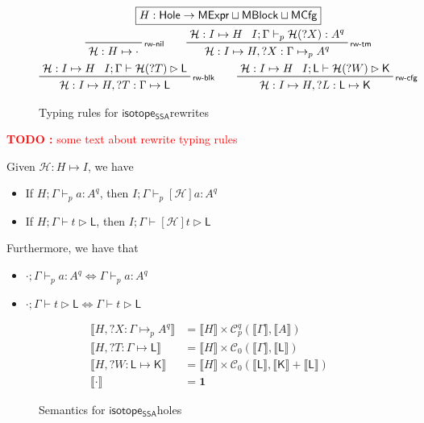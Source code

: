\documentclass[acmsmall,screen,review]{acmart}
\newcounter{todos}
\newcommand{\TODO}[1]{{
  \stepcounter{todos}
  \begin{center}\large{\textcolor{red}{\textbf{TODO \arabic{todos}:} #1}}\end{center}
}}
\newcommand{\mc}[1]{\ensuremath{\mathcal{#1}}}
\newcommand{\mb}[1]{\ensuremath{\mathbf{#1}}}
\newcommand{\ms}[1]{\ensuremath{\mathsf{#1}}}
\newcommand{\rle}[1]{{\scriptsize\textsf{#1}}}
\newcommand{\hasty}[5]{#1 \vdash_{#2} #3: {#4}^{#5}}
\newcommand{\haslb}[3]{#1 \vdash #2 \rhd #3}
\newcommand{\lhole}[1]{?#1}
\newcommand{\mhasty}[6]{#1;#2 \vdash_{#3} #4: {#5}^{#6}}
\newcommand{\mhaslb}[4]{#1;#2 \vdash #3 \rhd #4}
\newcommand{\mlhaslb}[4]{#1;#2 \vdash #3 \rhd #4}
\newcommand{\tyhole}[5]{#1: #2 \mapsto_{#3} {#4}^{#5}}
\newcommand{\blkhole}[3]{#1: #2 \mapsto #3}
\newcommand{\cfghole}[3]{#1: #2 \mapsto #3}
\newcommand{\isrw}[3]{#1: #2 \mapsto #3}
\newcommand{\dnt}[1]{\llbracket{#1}\rrbracket}
\newcommand{\isotopessa}{\ms{isotope_{SSA}}}
\begin{document}
\begin{figure}
  \begin{gather*}
    \boxed{H: \ms{Hole} \to \ms{MExpr} \sqcup \ms{MBlock} \sqcup \ms{MCfg}}
    \\
    \prftree[r]{\rle{rw-nil}}
      {\isrw{\mc{H}}{H}{\cdot}}
    \qquad
    \prftree[r]{\rle{rw-tm}}
      {\isrw{\mc{H}}{I}{H}}
      {\mhasty{I}{\Gamma}{p}{\mc{H}(\lhole{X})}{A}{q}}
      {\isrw{\mc{H}}{I}{H, \tyhole{\lhole{X}}{\Gamma}{p}{A}{q}}}
    \\
    \prftree[r]{\rle{rw-blk}}
      {\isrw{\mc{H}}{I}{H}}
      {\mhaslb{I}{\Gamma}{\mc{H}(\lhole{T})}{\ms{L}}}
      {\isrw{\mc{H}}{I}{H, \blkhole{\lhole{T}}{\Gamma}{\ms{L}}}}
    \qquad
    \prftree[r]{\rle{rw-cfg}}
      {\isrw{\mc{H}}{I}{H}}
      {\mlhaslb{I}{\ms{L}}{\mc{H}(\lhole{W})}{\ms{K}}}
      {\isrw{\mc{H}}{I}{H, \cfghole{\lhole{L}}{\ms{L}}{\ms{K}}}}
  \end{gather*}
  \caption{Typing rules for \isotopessa rewrites}
  \label{fig:rewrite-typing}
\end{figure}

\TODO{some text about rewrite typing rules}

\begin{theorem}[Rewriting]
  Given \(\isrw{\mc{H}}{H}{I}\), we have
  \begin{itemize}
    \item If \(\mhasty{H}{\Gamma}{p}{a}{A}{q}\), then \(\mhasty{I}{\Gamma}{p}{[\mc{H}]a}{A}{q}\)
    \item If \(\mhaslb{H}{\Gamma}{t}{\ms{L}}\), then \(\mhaslb{I}{\Gamma}{[\mc{H}]t}{\ms{L}}\)
  \end{itemize}
  
  Furthermore, we have that 
  \begin{itemize}
    \item \(\mhasty{\cdot}{\Gamma}{p}{a}{A}{q} \iff \hasty{\Gamma}{p}{a}{A}{q}\)
    \item \(\mhaslb{\cdot}{\Gamma}{t}{\ms{L}} \iff \haslb{\Gamma}{t}{\ms{L}}\)
  \end{itemize}
\end{theorem}

\begin{figure}
  \begin{align*}
    \dnt{H, \tyhole{\lhole{X}}{\Gamma}{p}{A}{q}}
      &= \dnt{H} \times \mc{C}_p^q(\dnt{\Gamma}, \dnt{A}) 
      \\
    \dnt{H, \blkhole{\lhole{T}}{\Gamma}{\ms{L}}}
      &= \dnt{H} \times \mc{C}_0(\dnt{\Gamma}, \dnt{\ms{L}}) 
      \\
    \dnt{H, \cfghole{\lhole{W}}{\ms{L}}{\ms{K}}}
      &= \dnt{H} \times \mc{C}_0(\dnt{\ms{L}}, \dnt{\ms{K}} + \dnt{\ms{L}}) 
      \\
    \dnt{\cdot} 
      &= \mb{1}
  \end{align*}
  \caption{Semantics for \isotopessa holes}
  \label{fig:holes-semantics}
\end{figure}
\end{document}
